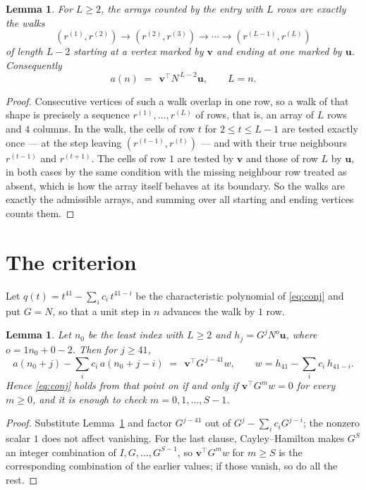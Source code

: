 \documentclass[11pt,a4paper]{article}
\theoremstyle{plain}
\newtheorem{lemma}[theorem]{Lemma}
\theoremstyle{definition}
\begin{document}
\begin{lemma}\label{lem:walk}
For $L\ge2$, the arrays counted by the entry with $L$ rows are exactly the walks
\[
(r^{(1)},r^{(2)})\to(r^{(2)},r^{(3)})\to\cdots\to(r^{(L-1)},r^{(L)})
\]
of length $L-2$ starting at a vertex marked by $\mathbf{v}$ and ending at one marked by
$\mathbf{u}$. Consequently
\[
a(n)\;=\;\,\mathbf{v}^{\!\top}N^{\,L-2}\mathbf{u},\qquad L=n .
\]
\end{lemma}

\begin{proof}
Consecutive vertices of such a walk overlap in one row, so a walk of that shape is
precisely a sequence $r^{(1)},\dots,r^{(L)}$ of rows, that is, an array of $L$ rows
and $4$ columns. In the walk, the cells of row $t$ for $2\le t\le L-1$ are tested
exactly once --- at the step leaving $(r^{(t-1)},r^{(t)})$ --- and with their true
neighbours $r^{(t-1)}$ and $r^{(t+1)}$. The cells of row $1$ are tested by
$\mathbf{v}$ and those of row $L$ by $\mathbf{u}$, in both cases by the same condition
with the missing neighbour row treated as absent, which is how the array itself behaves at
its boundary. So the walks are exactly the admissible arrays, and summing over all starting
and ending vertices counts them.
\end{proof}

\section{The criterion}

Let $q(t)=t^{41}-\sum_i c_i\,t^{41-i}$ be the characteristic polynomial of
\eqref{eq:conj} and put $G=N$, so that a unit step in $n$ advances the walk by
$1$ row.

\begin{lemma}\label{lem:crit}
Let $n_0$ be the least index with $L\ge2$ and $h_j=G^{j}N^{o}\mathbf{u}$, where
$o=1n_0+0-2$. Then for $j\ge41$,
\[
a(n_0+j)-\sum_i c_i\,a(n_0+j-i)\;=\;\,\mathbf{v}^{\!\top}G^{\,j-41}w,
\qquad w=h_{41}-\sum_i c_i\,h_{41-i} .
\]
Hence \eqref{eq:conj} holds from that point on if and only if
$\mathbf{v}^{\!\top}G^{m}w=0$ for every $m\ge0$, and it is enough to check
$m=0,1,\dots,S-1$.
\end{lemma}

\begin{proof}
Substitute Lemma~\ref{lem:walk} and factor $G^{j-41}$ out of
$G^{j}-\sum_ic_iG^{j-i}$; the nonzero scalar $1$ does not affect
vanishing. For the last clause, Cayley--Hamilton makes $G^{S}$ an integer combination of
$I,G,\dots,G^{S-1}$, so $\mathbf{v}^{\!\top}G^{m}w$ for $m\ge S$ is the corresponding
combination of the earlier values; if those vanish, so do all the rest.
\end{proof}
\end{document}
